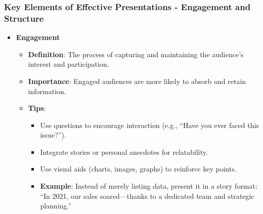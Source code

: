 \documentclass[aspectratio=169]{beamer}
\begin{document}
\begin{frame}[fragile]
    \frametitle{Key Elements of Effective Presentations - Engagement and Structure}
    \begin{itemize}
        \item \textbf{Engagement}
            \begin{itemize}
                \item \textbf{Definition}: The process of capturing and maintaining the audience’s interest and participation.
                \item \textbf{Importance}: Engaged audiences are more likely to absorb and retain information.
                \item \textbf{Tips}:
                    \begin{itemize}
                        \item Use questions to encourage interaction (e.g., “Have you ever faced this issue?”).
                        \item Integrate stories or personal anecdotes for relatability.
                        \item Use visual aids (charts, images, graphs) to reinforce key points.
                        \item \textbf{Example}: Instead of merely listing data, present it in a story format: “In 2021, our sales soared—thanks to a dedicated team and strategic planning.”
                    \end{itemize}
            \end{itemize}


\end{itemize}
\end{frame}
\end{document}
